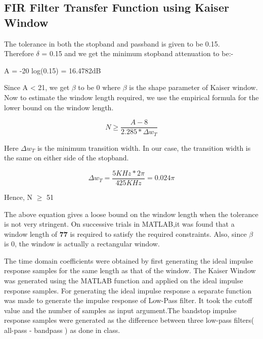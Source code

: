 \documentclass{article}
\begin{document}
\subsection{FIR Filter Transfer Function using Kaiser Window}

The tolerance in both the stopband and passband is given to be 0.15.\\
Therefore $\delta$ = 0.15 and we get the minimum stopband attenuation to be:-

\begin{center}
    A = -20 log(0.15) = 16.4782dB
\end{center}

Since A < 21, we get $\beta$ to be 0 where $\beta$ is the shape parameter of Kaiser window.\\
Now to estimate the window length required, we use the empirical formula for the lower bound on
the window length.

\begin{center}
    \begin{equation*}
        N \geq \frac{A-8}{2.285*\Delta w_T}
    \end{equation*}
\end{center}

Here $\Delta w_T$ is the minimum transition width. In our case, the transition width is the same on either
side of the stopband.

\begin{center}
    \begin{equation*}
        \Delta w_T = \frac{5KHz*2\pi}{425KHz} = 0.024 \pi
    \end{equation*}
\end{center}

\begin{center}
    Hence, N $\geq$ 51
\end{center}

The above equation gives a loose bound on the window length when the tolerance is not very stringent. On successive trials in MATLAB,it was found that a window length of $\textbf{77}$ is required to satisfy
the required constraints. Also, since $\beta$ is 0, the window is actually a rectangular window.
\newline

The time domain coefficients were obtained by first generating the ideal impulse response samples
for the same length as that of the window. The Kaiser Window was generated using the MATLAB
function and applied on the ideal impulse response samples. For generating the ideal impulse response a separate function was made to generate the impulse response of Low-Pass filter. It took the
cutoff value and the number of samples as input argument.The bandstop impulse response samples
were generated as the difference between three low-pass filters( all-pass - bandpass ) as done in class.\\
\end{document}
